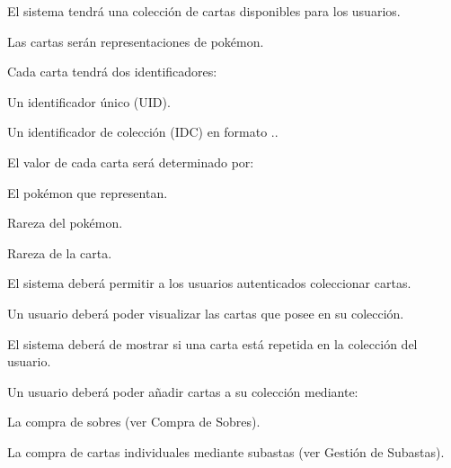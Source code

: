 


\begin{RFColeccionCartas}
	\item El sistema tendrá una colección de cartas disponibles para los usuarios.
	\begin{RFColeccionCartas}
		\item Las cartas serán representaciones de pokémon.
		\item Cada carta tendrá dos identificadores:
		\begin{RFColeccionCartas}
			\item Un identificador único (UID).
			\item Un identificador de colección (IDC) en formato ..
		\end{RFColeccionCartas}
		\item El valor de cada carta será determinado por:
		\begin{RFColeccionCartas}
			\item El pokémon que representan.
			\item Rareza del pokémon.
			\item Rareza de la carta.
		\end{RFColeccionCartas}
	\end{RFColeccionCartas}
	\item El sistema deberá permitir a los usuarios autenticados coleccionar cartas.\label{req_coleccion_cartas}
	\begin{RFColeccionCartas}
		\item Un usuario deberá poder visualizar las cartas que posee en su colección.
		\item El sistema deberá de mostrar si una carta está repetida en la colección del usuario.
		\item Un usuario deberá poder añadir cartas a su colección mediante:
		\begin{RFColeccionCartas}
			\item La compra de sobres (ver Compra de Sobres).
			\item La compra de cartas individuales mediante subastas (ver Gestión de Subastas).
		\end{RFColeccionCartas}
	\end{RFColeccionCartas}
\end{RFColeccionCartas}